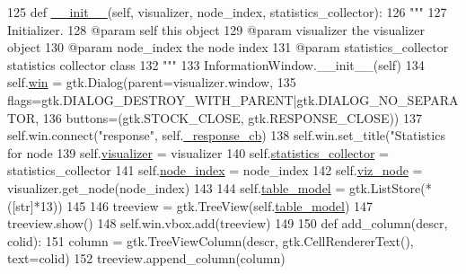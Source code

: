 \begin{DoxyCode}
125     \textcolor{keyword}{def }\hyperlink{classinterface__statistics_1_1ShowInterfaceStatistics_acdf9f1bd3026ed9a018ee70459f48ab0}{\_\_init\_\_}(self, visualizer, node\_index, statistics\_collector):
126         \textcolor{stringliteral}{"""}
127 \textcolor{stringliteral}{        Initializer.}
128 \textcolor{stringliteral}{        @param self this object}
129 \textcolor{stringliteral}{        @param visualizer the visualizer object}
130 \textcolor{stringliteral}{        @param node\_index the node index}
131 \textcolor{stringliteral}{        @param statistics\_collector statistics collector class}
132 \textcolor{stringliteral}{        """}
133         InformationWindow.\_\_init\_\_(self)
134         self.\hyperlink{classinterface__statistics_1_1ShowInterfaceStatistics_a779a0f4e2eb460c53cff775b55b13815}{win} = gtk.Dialog(parent=visualizer.window,
135                               flags=gtk.DIALOG\_DESTROY\_WITH\_PARENT|gtk.DIALOG\_NO\_SEPARATOR,
136                               buttons=(gtk.STOCK\_CLOSE, gtk.RESPONSE\_CLOSE))
137         self.win.connect(\textcolor{stringliteral}{"response"}, self.\hyperlink{classinterface__statistics_1_1ShowInterfaceStatistics_af4b9c825841e6a28782d4f145139be80}{\_response\_cb})
138         self.win.set\_title(\textcolor{stringliteral}{"Statistics for node %
139         self.\hyperlink{classinterface__statistics_1_1ShowInterfaceStatistics_a1547f0093ea7b91f54664f8ab6266b74}{visualizer} = visualizer
140         self.\hyperlink{classinterface__statistics_1_1ShowInterfaceStatistics_aec46892f4f5176428b1a216794387e56}{statistics\_collector} = statistics\_collector
141         self.\hyperlink{classinterface__statistics_1_1ShowInterfaceStatistics_abbc97003c4c6ed1b21f6825e6a6e46f7}{node\_index} = node\_index
142         self.\hyperlink{classinterface__statistics_1_1ShowInterfaceStatistics_a3c1117b6913c299dae47950a3d7720a6}{viz\_node} = visualizer.get\_node(node\_index)
143 
144         self.\hyperlink{classinterface__statistics_1_1ShowInterfaceStatistics_acd0afcf7ebcf7e64428196ef5526fbe6}{table\_model} = gtk.ListStore(*([str]*13))
145 
146         treeview = gtk.TreeView(self.\hyperlink{classinterface__statistics_1_1ShowInterfaceStatistics_acd0afcf7ebcf7e64428196ef5526fbe6}{table\_model})
147         treeview.show()
148         self.win.vbox.add(treeview)
149         
150         \textcolor{keyword}{def }add\_column(descr, colid):
151             column = gtk.TreeViewColumn(descr, gtk.CellRendererText(), text=colid)
152             treeview.append\_column(column)
}
\end{DoxyCode}

